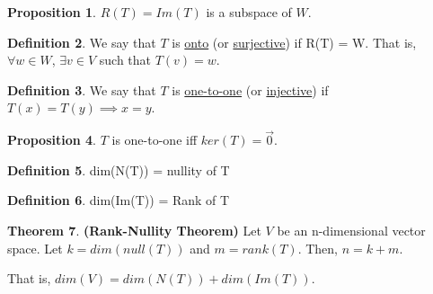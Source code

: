 \documentclass[a5paper]{article}
\makeatletter
\renewenvironment{proof}{{\bfseries Proof}}{\qed}
\renewenvironment{proof}[1][\bfseries \proofname]{\par
  \pushQED{\qed}%
  \normalfont \topsep6\p@\@plus6\p@\relax
  \trivlist
  \item[\hskip\labelsep
        \scshape
    #1\@addpunct{}]\ignorespaces
}{%
  \popQED\endtrivlist\@endpefalse
}
\theoremstyle{definition}%
\newtheorem{theorem}{Theorem}
\numberwithin{theorem}{section} %
\newtheorem{definition}[theorem]{Definition}
\newtheorem{proposition}[theorem]{Proposition}
\makeatother
\begin{document}
\begin{proposition}
$R(T) = Im(T)$ is a subspace of $W$. 
\end{proposition}

\begin{definition}
We say that $T$ is \underline{onto} (or \underline{surjective}) if R(T) = W. That is, $\forall	w \in W$, $\exists v \in V$ such that $T(v)=w$.
\end{definition}

\begin{definition}
We say that $T$ is \underline{one-to-one} (or \underline{injective}) if $T(x) = T(y) \implies x=y$.
\end{definition}

\begin{proposition}
$T$ is one-to-one iff $ker(T)=\vec{0}$.


\end{proposition}

\begin{definition}
dim(N(T)) = nullity of T
\end{definition}

\begin{definition}
dim(Im(T)) = Rank of T
\end{definition}

\begin{theorem}
\textbf{(Rank-Nullity Theorem)}
Let $V$ be an n-dimensional vector space. Let $k=dim(null(T))$ and $m=rank(T)$. Then, $n=k+m$. 

That is, $dim(V) = dim(N(T)) + dim(Im(T))$. 
\end{theorem} 
\end{document}
